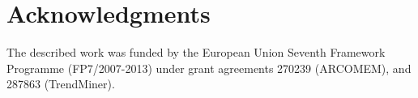 \documentclass{../acm_proc_article-me11_tweaked}
\begin{document}
\section{Acknowledgments}
The described work was funded by the European Union Seventh Framework Programme (FP7/2007-2013) under grant agreements 270239 (ARCOMEM), and 287863 (TrendMiner).




\end{document}
